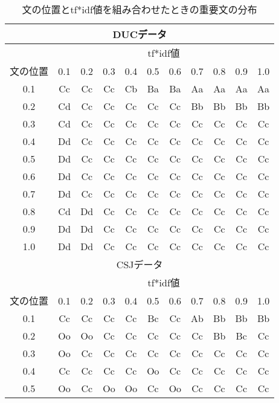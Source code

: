 \begin{table}[tb]\small
\caption{文の位置とtf*idf値を組み合わせたときの重要文の分布}
\label{table:diagram_pst_tfidf}
\begin{center}
\begin{tabular}{c|cccccccccc} \hline \hline
\multicolumn{11}{c}{DUCデータ} \\ \hline
 & \multicolumn{10}{c}{tf*idf値} \\ \cline{2-11}
文の位置 & 0.1 & 0.2 & 0.3 & 0.4 & 0.5 & 0.6 & 0.7 & 0.8 & 0.9 & 1.0 \\ \hline
0.1                    & Cc & Cc & Cc & Cb & Ba & Ba & Aa & Aa & Aa & Aa \\
0.2                    & Cd & Cc & Cc & Cc & Cc & Cc & Bb & Bb & Bb & Bb \\
0.3                    & Cd & Cc & Cc & Cc & Cc & Cc & Cc & Cc & Cc & Cc \\
0.4                    & Dd & Cc & Cc & Cc & Cc & Cc & Cc & Cc & Cc & Cc \\
0.5                    & Dd & Cc & Cc & Cc & Cc & Cc & Cc & Cc & Cc & Cc \\
0.6                    & Dd & Cc & Cc & Cc & Cc & Cc & Cc & Cc & Cc & Cc \\
0.7                    & Dd & Cc & Cc & Cc & Cc & Cc & Cc & Cc & Cc & Cc \\
0.8                    & Cd & Dd & Cc & Cc & Cc & Cc & Cc & Cc & Cc & Cc \\
0.9                    & Dd & Dd & Cc & Cc & Cc & Cc & Cc & Cc & Cc & Cc \\
1.0                    & Dd & Dd & Cc & Cc & Cc & Cc & Cc & Cc & Cc & Cc \\
\hline \hline 
\multicolumn{11}{c}{CSJデータ} \\ \hline
 & \multicolumn{10}{c}{tf*idf値} \\ \cline{2-11}
文の位置 & 0.1 & 0.2 & 0.3 & 0.4 & 0.5 & 0.6 & 0.7 & 0.8 & 0.9 & 1.0 \\ \hline
0.1                    & Cc & Cc & Cc & Cc & Bc & Cc & Ab & Bb & Bb & Bb \\
0.2                    & Oo & Oo & Cc & Cc & Cc & Cc & Cc & Bb & Bc & Cc \\
0.3                    & Oo & Cc & Cc & Cc & Cc & Cc & Cc & Cc & Cc & Cc \\
0.4                    & Cc & Cc & Cc & Cc & Oo & Cc & Cc & Cc & Cc & Cc \\
0.5                    & Oo & Cc & Oo & Oo & Cc & Oo & Cc & Cc & Cc & Cc \\

\end{tabular}
\end{center}
\end{table}
